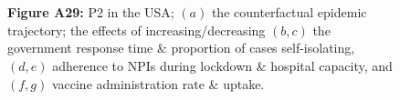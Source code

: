 \documentclass[paper=a4,fontsize=11pt]{article}
\begin{document}
\begin{figure}[!h]
  \\
  \hspace{1.76cm}
  \\
  \caption*{\textbf{Figure A29:} P2 in the USA; $(a)$ the counterfactual epidemic trajectory; the effects of increasing/decreasing $(b,c)$ the government response time \& proportion of cases self-isolating, $(d,e)$ adherence to NPIs during lockdown \& hospital capacity, and $(f,g)$ vaccine administration rate \& uptake.}
\end{figure}
\end{document}
